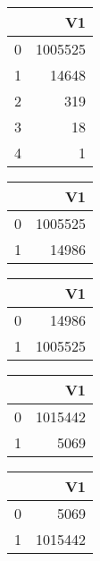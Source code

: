 \bigskip\bigskip
\centering
\begin{tabular}{rr}
  \hline
 & V1 \\ 
  \hline
0 & 1005525 \\ 
  1 & 14648 \\ 
  2 & 319 \\ 
  3 &  18 \\ 
  4 &   1 \\ 
   \hline
\end{tabular}

\bigskip\bigskip
\centering
\begin{tabular}{rr}
  \hline
 & V1 \\ 
  \hline
0 & 1005525 \\ 
  1 & 14986 \\ 
   \hline
\end{tabular}

\bigskip\bigskip
\centering
\begin{tabular}{rr}
  \hline
 & V1 \\ 
  \hline
0 & 14986 \\ 
  1 & 1005525 \\ 
   \hline
\end{tabular}

\bigskip\bigskip
\centering
\begin{tabular}{rr}
  \hline
 & V1 \\ 
  \hline
0 & 1015442 \\ 
  1 & 5069 \\ 
   \hline
\end{tabular}

\bigskip\bigskip
\centering
\begin{tabular}{rr}
  \hline
 & V1 \\ 
  \hline
0 & 5069 \\ 
  1 & 1015442 \\ 
   \hline
\end{tabular}


